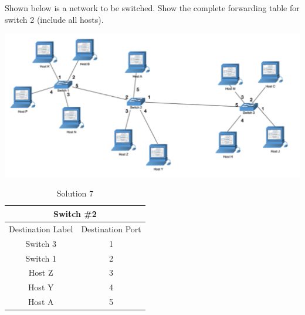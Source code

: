 \documentclass[12pt,addpoints,answers]{exam}
\begin{document}
\begin{questions}

\question[10] Shown below is a network to be switched. Show the complete forwarding table for switch 2 (include all hosts).
\begin{center}\includegraphics[width=0.9\linewidth]{fig/switches.png}\end{center}
\begin{solution}[5in]

\end{solution}
\begin{table}[]
	\centering
	\caption{Solution 7}
	\label{Table 1}
	\begin{tabular}{|c|c|}
		\hline
		\multicolumn{2}{|c|}{Switch \#2}      \\ \hline
		Destination Label & Destination Port \\ \hline
		Switch 3          & 1                \\
		Switch 1          & 2                \\
		Host Z            & 3                \\
		Host Y            & 4                \\
		Host A            & 5                \\ \hline
	\end{tabular}
\end{table}


\end{questions}
\end{document}
